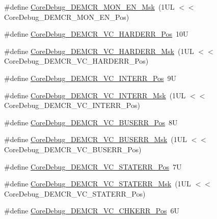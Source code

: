 \begin{DoxyCompactItemize}
\item 
\#define \hyperlink{group___c_m_s_i_s___core_debug_gac2b46b9b65bf8d23027f255fc9641977}{Core\-Debug\-\_\-\-D\-E\-M\-C\-R\-\_\-\-M\-O\-N\-\_\-\-E\-N\-\_\-\-Msk}~(1\-U\-L $<$$<$ Core\-Debug\-\_\-\-D\-E\-M\-C\-R\-\_\-\-M\-O\-N\-\_\-\-E\-N\-\_\-\-Pos)
\item 
\#define \hyperlink{group___c_m_s_i_s___core_debug_gaed9f42053031a9a30cd8054623304c0a}{Core\-Debug\-\_\-\-D\-E\-M\-C\-R\-\_\-\-V\-C\-\_\-\-H\-A\-R\-D\-E\-R\-R\-\_\-\-Pos}~10\-U
\item 
\#define \hyperlink{group___c_m_s_i_s___core_debug_ga803fc98c5bb85f10f0347b23794847d1}{Core\-Debug\-\_\-\-D\-E\-M\-C\-R\-\_\-\-V\-C\-\_\-\-H\-A\-R\-D\-E\-R\-R\-\_\-\-Msk}~(1\-U\-L $<$$<$ Core\-Debug\-\_\-\-D\-E\-M\-C\-R\-\_\-\-V\-C\-\_\-\-H\-A\-R\-D\-E\-R\-R\-\_\-\-Pos)
\item 
\#define \hyperlink{group___c_m_s_i_s___core_debug_ga22079a6e436f23b90308be97e19cf07e}{Core\-Debug\-\_\-\-D\-E\-M\-C\-R\-\_\-\-V\-C\-\_\-\-I\-N\-T\-E\-R\-R\-\_\-\-Pos}~9\-U
\item 
\#define \hyperlink{group___c_m_s_i_s___core_debug_gad6815d8e3df302d2f0ff2c2c734ed29a}{Core\-Debug\-\_\-\-D\-E\-M\-C\-R\-\_\-\-V\-C\-\_\-\-I\-N\-T\-E\-R\-R\-\_\-\-Msk}~(1\-U\-L $<$$<$ Core\-Debug\-\_\-\-D\-E\-M\-C\-R\-\_\-\-V\-C\-\_\-\-I\-N\-T\-E\-R\-R\-\_\-\-Pos)
\item 
\#define \hyperlink{group___c_m_s_i_s___core_debug_gab8e3d8f0f9590a51bbf10f6da3ad6933}{Core\-Debug\-\_\-\-D\-E\-M\-C\-R\-\_\-\-V\-C\-\_\-\-B\-U\-S\-E\-R\-R\-\_\-\-Pos}~8\-U
\item 
\#define \hyperlink{group___c_m_s_i_s___core_debug_ga9d29546aefe3ca8662a7fe48dd4a5b2b}{Core\-Debug\-\_\-\-D\-E\-M\-C\-R\-\_\-\-V\-C\-\_\-\-B\-U\-S\-E\-R\-R\-\_\-\-Msk}~(1\-U\-L $<$$<$ Core\-Debug\-\_\-\-D\-E\-M\-C\-R\-\_\-\-V\-C\-\_\-\-B\-U\-S\-E\-R\-R\-\_\-\-Pos)
\item 
\#define \hyperlink{group___c_m_s_i_s___core_debug_ga16f0d3d2ce1e1e8cd762d938ac56c4ac}{Core\-Debug\-\_\-\-D\-E\-M\-C\-R\-\_\-\-V\-C\-\_\-\-S\-T\-A\-T\-E\-R\-R\-\_\-\-Pos}~7\-U
\item 
\#define \hyperlink{group___c_m_s_i_s___core_debug_gaa38b947d77672c48bba1280c0a642e19}{Core\-Debug\-\_\-\-D\-E\-M\-C\-R\-\_\-\-V\-C\-\_\-\-S\-T\-A\-T\-E\-R\-R\-\_\-\-Msk}~(1\-U\-L $<$$<$ Core\-Debug\-\_\-\-D\-E\-M\-C\-R\-\_\-\-V\-C\-\_\-\-S\-T\-A\-T\-E\-R\-R\-\_\-\-Pos)
\item 
\#define \hyperlink{group___c_m_s_i_s___core_debug_ga10fc7c53bca904c128bc8e1a03072d50}{Core\-Debug\-\_\-\-D\-E\-M\-C\-R\-\_\-\-V\-C\-\_\-\-C\-H\-K\-E\-R\-R\-\_\-\-Pos}~6\-U
$$
\end{DoxyCompactItemize}
